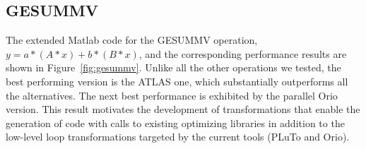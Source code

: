 \documentclass[11pt]{article}
\begin{document}
%


\subsection{GESUMMV}


The extended Matlab code for the GESUMMV operation, $y = a * (A * x) + b * (B * x)$,
and the corresponding performance results are shown in Figure~\ref{fig:gesummv}. Unlike all the other operations we tested, the best performing version is the ATLAS one, which substantially outperforms all the alternatives. The next best performance is exhibited by the parallel Orio version. This result motivates the development of transformations that enable the generation of code with calls to existing optimizing libraries in addition to the low-level loop transformations targeted by the current tools (PLuTo and Orio).
\end{document}
